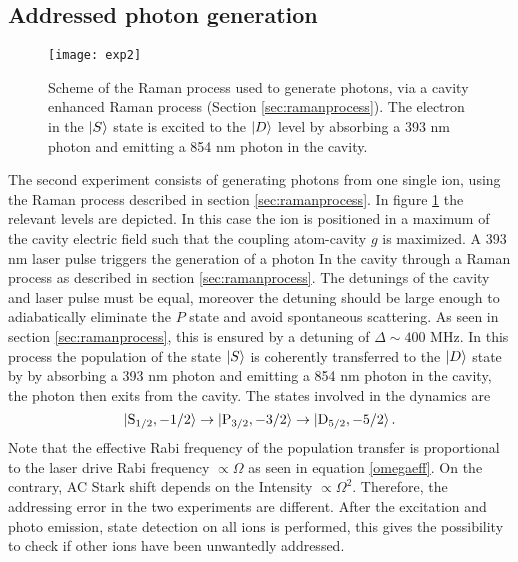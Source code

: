 \subsection{Addressed photon generation}
\label{sec:expphoton}
\begin{figure}
\centering
\texttt{[image: exp2]}
\caption{Scheme of the Raman process used to generate photons, via a cavity enhanced Raman process (Section \ref{sec:ramanprocess}). The electron in the $\ket{S}$ state is excited to the $\ket{D}$ level by absorbing a 393 nm photon and emitting a 854 nm photon in the cavity.}
\label{img:sec2}
\end{figure}
The second experiment consists of generating photons from one single ion, using the Raman process described in section \ref{sec:ramanprocess}. In figure \ref{img:sec2} the relevant levels are depicted. In this case the ion is positioned in a maximum of the cavity electric field such that the coupling atom-cavity $g$ is maximized. A 393 nm laser pulse triggers the generation of a photon In the cavity through a Raman process as described in section \ref{sec:ramanprocess}. The detunings of the cavity and laser pulse must be equal, moreover the detuning should be large enough to adiabatically eliminate the $P$ state and avoid spontaneous scattering. As seen in section \ref{sec:ramanprocess}, this is ensured by a detuning of $\Delta \sim 400$ MHz.
In this process the population of the state $\ket{S}$ is coherently transferred to the $\ket{D}$ state by by absorbing a 393 nm photon and emitting a 854 nm photon in the cavity, the photon then exits from the cavity. The states involved in the dynamics are
\begin{equation}
\ket{\text{S}_{1/2},-1/2} \to \ket{\text{P}_{3/2},-3/2} \to \ket{\text{D}_{5/2},-5/2}.
\end{equation}
Note that the effective Rabi frequency of the population transfer is proportional to the laser drive Rabi frequency $\propto \Omega$ as seen in equation \eqref{omegaeff}. On the contrary, AC Stark shift depends on the Intensity $\propto \Omega^2$. Therefore, the addressing error in the two experiments are different. After the excitation and photo emission, state detection on all ions is performed, this gives the possibility to check if other ions have been unwantedly addressed.
